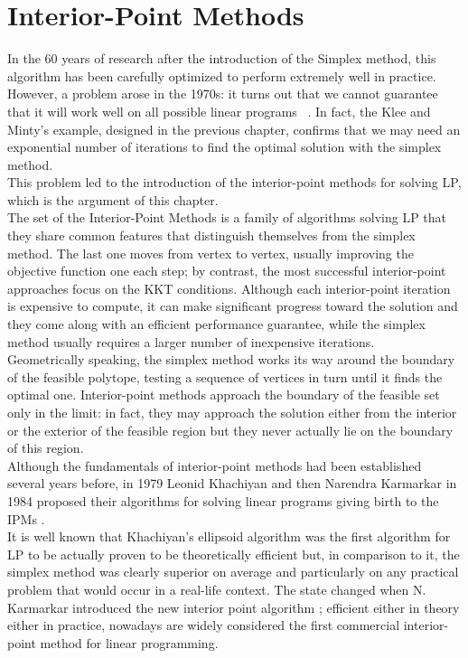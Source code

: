 \documentclass[a4paper,10 pt,titlepage,twoside]{book}
\theoremstyle{plain}
\theoremstyle{definition}
\theoremstyle{remark}
\begin{document}
\chapter{Interior-Point Methods}
In the 60 years of research after the introduction of the Simplex method, this algorithm has been carefully optimized to perform extremely well in practice. However, a problem arose in the 1970s: it turns out that we cannot guarantee that it will work well on all possible linear programs ~\cite{MINTY}.
In fact, the Klee and Minty's example, designed in the previous chapter, confirms that we may need an exponential number of iterations to find the optimal solution with the simplex method. \\
This problem led to the introduction of the interior-point methods for solving LP, which is the argument of this chapter.\\
The set of the Interior-Point Methods is a family of algorithms solving LP that they share common features that distinguish themselves from the simplex method. The last one moves from vertex to vertex, usually improving the objective function
one each step; by contrast, the most successful interior-point approaches focus on the KKT conditions. Although each interior-point iteration is expensive to compute, it can make significant progress toward the solution and they come along with an efficient performance guarantee, while the simplex method usually requires a larger number of inexpensive iterations.\\
Geometrically speaking, the simplex method works its way around
the boundary of the feasible polytope, testing a sequence of vertices in turn until it finds the
optimal one. Interior-point methods approach the boundary of the feasible set only in the
limit: in fact, they may approach the solution either from the interior or the exterior of the feasible
region but they never actually lie on the boundary of this region.\\
Although the fundamentals of interior-point methods had been established several years
before, in 1979 Leonid Khachiyan and then Narendra Karmarkar in 1984 proposed their algorithms for solving linear programs giving birth to the IPMs \cite{WWW}. \\It is well known that Khachiyan’s ellipsoid algorithm was the first algorithm for LP to be actually proven to
be theoretically efficient but, in comparison to it, the simplex method was clearly superior on average and particularly on any practical
problem that would occur in a real-life context. The state changed when N. Karmarkar introduced the new interior point algorithm \cite{Kar}; efficient either in theory either in practice, nowadays are widely considered the first commercial interior-point
method for linear programming.\\
\end{document}

